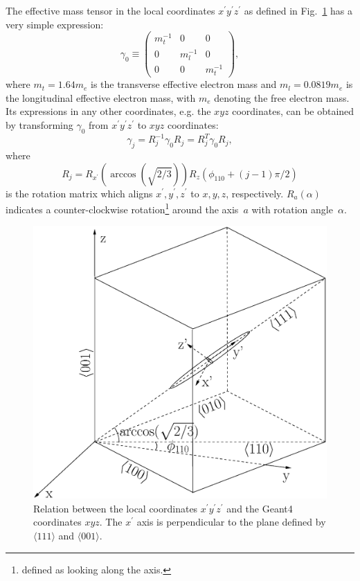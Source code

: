 \documentclass[epj]{svjour}
\begin{document}
\begin{appendices}
The effective mass tensor in the local coordinates $x^{\prime}
y^{\prime} z^{\prime}$ as defined in Fig.~\ref{f:axes} has a very
simple expression:
\begin{equation} 
\label{e:g0} 
\gamma_{0} \equiv \left( 
\begin{array}{ccc} 
m_{t}^{-1} & 0 & 0 \\ 
0 & m_{l}^{-1} & 0 \\ 
0 & 0 & m_{t}^{-1} 
\end{array} \right), 
\end{equation} 
where $m_{t} = 1.64m_{e}$ is the transverse effective electron mass
and $m_{l} = 0.0819m_{e}$ is the longitudinal effective electron mass,
with $m_{e}$ denoting the free electron mass. Its expressions in any
other coordinates, e.g. the $xyz$ coordinates, can be obtained by
transforming $\gamma_{0}$ from $x^{\prime} y^{\prime} z^{\prime}$ to
$xyz$ coordinates:
\begin{equation} 
\label{e:gs} 
\gamma_{j} = R_{j}^{-1}\gamma_{0}R_{j} = R_{j}^{T}\gamma_{0}R_{j}, 
\end{equation} 
where 
\begin{equation} 
\label{e:rs} 
R_{j} = R_{x^{\prime}}(\arccos(\sqrt{2/3}))R_{z}(\phi_{110}+(j-1)\pi/2) 
\end{equation} 
is the rotation matrix which aligns $x^{\prime}, y^{\prime},
z^{\prime}$ to $x,y,z$, respectively. $R_a(\alpha)$ indicates a
counter-clockwise rotation\footnote{defined as looking along the
axis.} around the axis~$a$ with rotation angle~$\alpha$.
 
\begin{figure}[htpb]
\centering
\includegraphics[width=0.7\linewidth]{axes}   
\caption{Relation between the local coordinates $x^{\prime} y^{\prime}
z^{\prime}$ and the Geant4 coordinates $xyz$. The $x^{\prime}$ axis is
perpendicular to the plane defined by $\langle111\rangle$ and $\langle
001 \rangle$.}
\label{f:axes} 
\end{figure} 


\end{appendices}
\end{document}
